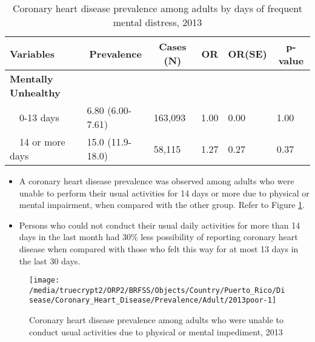 \begin{table}[H]
\caption{Coronary heart disease prevalence among adults by days of frequent mental distress, 2013\label{tab:mental.Coronary_Heart_Disease.2013}} 
\begin{center}
\begin{tabular}{llllll}
\hline\hline
\multicolumn{1}{l}{Variables}&\multicolumn{1}{c}{Prevalence}&\multicolumn{1}{c}{Cases (N)}&\multicolumn{1}{c}{OR}&\multicolumn{1}{c}{OR(SE)}&\multicolumn{1}{c}{p-value}\tabularnewline
\hline
{\bfseries Mentally Unhealthy}&&&&&\tabularnewline
~~0-13 days&6.80 (6.00-7.61)&163,093&1.00&0.00&1.00\tabularnewline
~~14 or more days&15.0 (11.9-18.0)& 58,115&1.27&0.27&0.37\tabularnewline
\hline
\end{tabular}\end{center}

\end{table}



 \newpage
\begin{itemize}

\item A  
coronary heart disease prevalence was observed among adults who were unable to perform their usual activities for 14 days or more due to physical or mental impairment, when compared with the other group. Refer to Figure \ref{fig:poor.Coronary_Heart_Disease.2013}.



\item Persons who could not conduct their usual daily activities for more than 14 days in the last month had 30\% less possibility of reporting coronary heart disease when compared with those who felt this way for at most 13 days in the last 30 days.

\end{itemize}

\begin{figure}[H]
\caption{Coronary heart disease prevalence among adults who were unable to conduct usual activities due to physical or mental impediment, 2013}
\label{fig:poor.Coronary_Heart_Disease.2013}

\begin{knitrout}
\color{fgcolor}

{\centering \texttt{[image: /media/truecrypt2/ORP2/BRFSS/Objects/Country/Puerto\_Rico/Disease/Coronary\_Heart\_Disease/Prevalence/Adult/2013poor-1]} 

}



\end{knitrout}
\end{figure}

